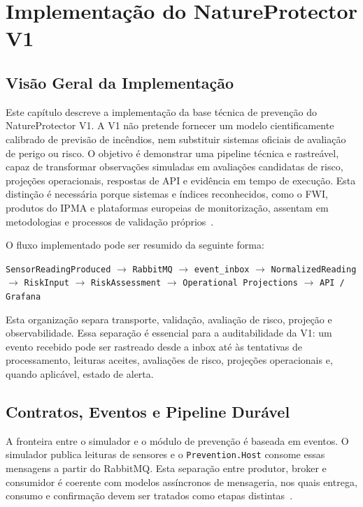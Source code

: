 \chapter{Implementação do NatureProtector V1}

\section{Visão Geral da Implementação}

Este capítulo descreve a implementação da base técnica de prevenção do NatureProtector V1. A V1 não pretende fornecer um modelo cientificamente calibrado de previsão de incêndios, nem substituir sistemas oficiais de avaliação de perigo ou risco. O objetivo é demonstrar uma pipeline técnica e rastreável, capaz de transformar observações simuladas em avaliações candidatas de risco, projeções operacionais, respostas de API e evidência em tempo de execução. Esta distinção é necessária porque sistemas e índices reconhecidos, como o FWI, produtos do IPMA e plataformas europeias de monitorização, assentam em metodologias e processos de validação próprios~\citep{nrcan_fwi_system,ipma_fwi,ipma_pir_rcm,ec_jrc_effis}.

O fluxo implementado pode ser resumido da seguinte forma:

\begin{center}
\texttt{SensorReadingProduced}
$\rightarrow$
\texttt{RabbitMQ}
$\rightarrow$
\texttt{event\_inbox}
$\rightarrow$
\texttt{NormalizedReading}
$\rightarrow$
\texttt{RiskInput}
$\rightarrow$
\texttt{RiskAssessment}
$\rightarrow$
\texttt{Operational Projections}
$\rightarrow$
\texttt{API / Grafana}
\end{center}

Esta organização separa transporte, validação, avaliação de risco, projeção e observabilidade. Essa separação é essencial para a auditabilidade da V1: um evento recebido pode ser rastreado desde a inbox até às tentativas de processamento, leituras aceites, avaliações de risco, projeções operacionais e, quando aplicável, estado de alerta.

\section{Contratos, Eventos e Pipeline Durável}

A fronteira entre o simulador e o módulo de prevenção é baseada em eventos. O simulador publica leituras de sensores e o \texttt{Prevention.Host} consome essas mensagens a partir do RabbitMQ. Esta separação entre produtor, broker e consumidor é coerente com modelos assíncronos de mensageria, nos quais entrega, consumo e confirmação devem ser tratados como etapas distintas~\citep{rabbitmq_amqp_model,rabbitmq_consumer_acknowledgements}.

